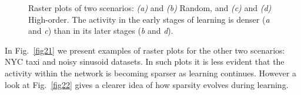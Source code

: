\documentclass[11pt,letterpaper]{article}
\begin{document}
\begin{figure}[t]
{				    \label{fig20:c}
			    }
			    \caption{
			        Raster plots of two scenarios: \emph{(a)} and \emph{(b)} Random, 
			        and \emph{(c)} and \emph{(d)} High-order.
			        The activity in the early stages of learning is denser (\emph{a} and \emph{c}) than
			        in its later stages (\emph{b} and \emph{d}).
			    }
			    \label{fig20}
		    \end{figure}		    

            In Fig.~\ref{fig21} we present examples of raster plots for the other two scenarios: 
            NYC taxi and noisy sinusoid datasets.
            In such plots it is less evident that the activity within the network is becoming sparser
            as learning continues.
            However a look at Fig.~\ref{fig22} gives a clearer idea of how sparsity evolves during
            learning.
            
\end{document}
